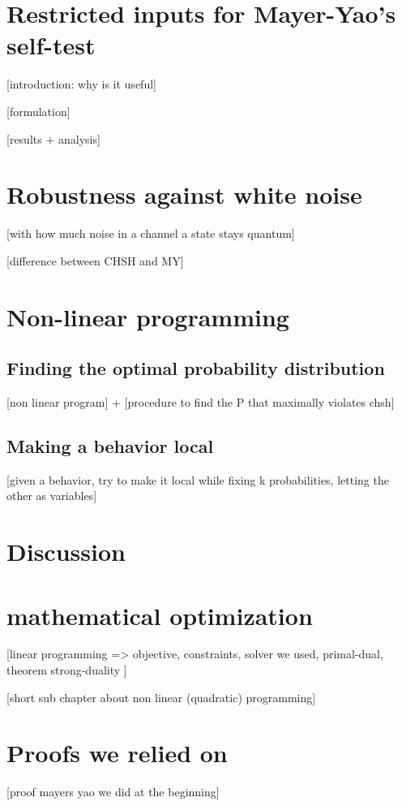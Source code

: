 \section{Restricted inputs for Mayer-Yao’s self-test}

[introduction: why is it useful]

[formulation]

[results + analysis]

\section{Robustness against white noise}
[with how much noise in a channel a state stays quantum]

[difference between CHSH and MY]

\section{Non-linear programming}
\subsection{Finding the optimal probability distribution}
[non linear program] + [procedure to find the P that maximally violates chsh]

\subsection{Making a behavior local}
[given a behavior, try to make it local while fixing k probabilities,
letting the other as variables]


\section{Discussion} 

\appendix
\section{mathematical optimization}

[linear programming => objective, constraints, solver we used, primal-dual, 
theorem strong-duality ]

[short sub chapter about non linear (quadratic) programming]

\section{Proofs we relied on}
[proof mayers yao we did at the beginning]